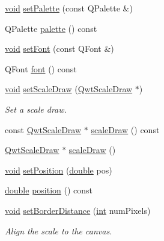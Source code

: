 \begin{DoxyCompactItemize}
\item 
\hyperlink{group___u_a_v_objects_plugin_ga444cf2ff3f0ecbe028adce838d373f5c}{void} \hyperlink{class_qwt_plot_scale_item_aff7adf18c2a6f679227c0fdaa54f39f7}{set\-Palette} (const Q\-Palette \&)
\item 
Q\-Palette \hyperlink{class_qwt_plot_scale_item_a6e48f16a93b7e7dcb98c6bfda3b11c2e}{palette} () const 
\item 
\hyperlink{group___u_a_v_objects_plugin_ga444cf2ff3f0ecbe028adce838d373f5c}{void} \hyperlink{class_qwt_plot_scale_item_a8f2bc7a401bb3e1cf796ff024032e31d}{set\-Font} (const Q\-Font \&)
\item 
Q\-Font \hyperlink{class_qwt_plot_scale_item_ada859305224f3eec06e23dc7c3ce8f9c}{font} () const 
\item 
\hyperlink{group___u_a_v_objects_plugin_ga444cf2ff3f0ecbe028adce838d373f5c}{void} \hyperlink{class_qwt_plot_scale_item_a0224f2720f3df4fc781d10560a4a1590}{set\-Scale\-Draw} (\hyperlink{class_qwt_scale_draw}{Qwt\-Scale\-Draw} $\ast$)
\begin{DoxyCompactList}\small\item\em Set a scale draw. \end{DoxyCompactList}\item 
const \hyperlink{class_qwt_scale_draw}{Qwt\-Scale\-Draw} $\ast$ \hyperlink{class_qwt_plot_scale_item_abdcced6eb4179319aeeeba370ec54a0f}{scale\-Draw} () const 
\item 
\hyperlink{class_qwt_scale_draw}{Qwt\-Scale\-Draw} $\ast$ \hyperlink{class_qwt_plot_scale_item_ab75d17fe11c146b49ffa47940f512850}{scale\-Draw} ()
\item 
\hyperlink{group___u_a_v_objects_plugin_ga444cf2ff3f0ecbe028adce838d373f5c}{void} \hyperlink{class_qwt_plot_scale_item_a94536af312bb9d6de5bc7547c59e4faf}{set\-Position} (\hyperlink{_super_l_u_support_8h_a8956b2b9f49bf918deed98379d159ca7}{double} pos)
\item 
\hyperlink{_super_l_u_support_8h_a8956b2b9f49bf918deed98379d159ca7}{double} \hyperlink{class_qwt_plot_scale_item_a7228e5fc436e1cfb403c38974b781185}{position} () const 
\item 
\hyperlink{group___u_a_v_objects_plugin_ga444cf2ff3f0ecbe028adce838d373f5c}{void} \hyperlink{class_qwt_plot_scale_item_a34bb235d0715d9c13669fe90669fc545}{set\-Border\-Distance} (\hyperlink{ioapi_8h_a787fa3cf048117ba7123753c1e74fcd6}{int} num\-Pixels)
\begin{DoxyCompactList}\small\item\em Align the scale to the canvas. \end{DoxyCompactList}\item 

\end{DoxyCompactItemize}
